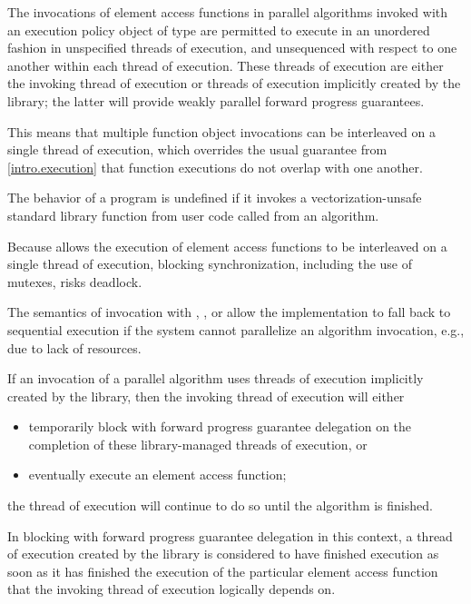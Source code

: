 \pnum
The invocations of element access functions in parallel algorithms invoked with
an execution policy object of type  are
permitted to execute
in an unordered fashion in unspecified threads of execution, and
unsequenced with respect to one another within each thread of execution.
These threads of execution are
either the invoking thread of execution
or threads of execution implicitly created by the library;
the latter will provide weakly parallel forward progress guarantees.
\begin{note}
This means that multiple function object invocations can be interleaved
on a single thread of execution,
which overrides the usual guarantee from \ref{intro.execution}
that function executions do not overlap with one another.
\end{note}
The behavior of a program is undefined if
it invokes a vectorization-unsafe standard library function
from user code
called from an  algorithm.
\begin{note}
Because  allows
the execution of element access functions
to be interleaved on a single thread of execution,
blocking synchronization, including the use of mutexes, risks deadlock.
\end{note}

\pnum
\begin{note}
The semantics of invocation with
,
, or
allow the implementation to fall back to sequential execution
if the system cannot parallelize an algorithm invocation,
e.g., due to lack of resources.
\end{note}

\pnum
If an invocation of a parallel algorithm uses threads of execution
implicitly created by the library,
then the invoking thread of execution will either
\begin{itemize}
\item
  temporarily block
  with forward progress guarantee delegation
  on the completion of these library-managed threads of execution, or
\item
  eventually execute an element access function;
\end{itemize}
the thread of execution will continue to do so until the algorithm is finished.
\begin{note}
In blocking with forward progress guarantee delegation in this context,
a thread of execution created by the library
is considered to have finished execution
as soon as it has finished the execution
of the particular element access function
that the invoking thread of execution logically depends on.
\end{note}

